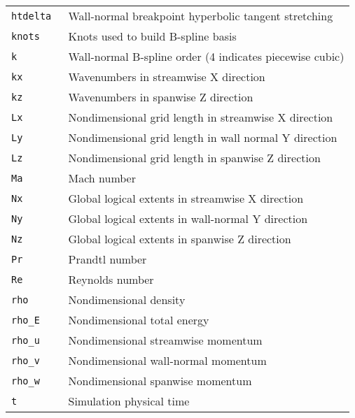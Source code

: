 \begin{table}
\begin{small}
\begin{tabular}{p{}|p{}}
\texttt{htdelta               } & Wall-normal breakpoint hyperbolic tangent stretching \\
\texttt{knots                 } & Knots used to build B-spline basis \\
\texttt{k                     } & Wall-normal B-spline order (4 indicates piecewise cubic) \\
\texttt{kx                    } & Wavenumbers in streamwise X direction \\
\texttt{kz                    } & Wavenumbers in spanwise Z direction \\
\texttt{Lx                    } & Nondimensional grid length in streamwise X direction \\
\texttt{Ly                    } & Nondimensional grid length in wall normal Y direction \\
\texttt{Lz                    } & Nondimensional grid length in spanwise Z direction \\
\texttt{Ma                    } & Mach number \\
\texttt{Nx                    } & Global logical extents in streamwise X direction \\
\texttt{Ny                    } & Global logical extents in wall-normal Y direction \\
\texttt{Nz                    } & Global logical extents in spanwise Z direction \\
\texttt{Pr                    } & Prandtl number \\
\texttt{Re                    } & Reynolds number \\
\texttt{rho                   } & Nondimensional density \\
\texttt{rho\_E                } & Nondimensional total energy \\
\texttt{rho\_u                } & Nondimensional streamwise momentum \\
\texttt{rho\_v                } & Nondimensional wall-normal momentum \\
\texttt{rho\_w                } & Nondimensional spanwise momentum \\
\texttt{t                     } & Simulation physical time \\
\end{tabular}
\end{small}
\end{table}

